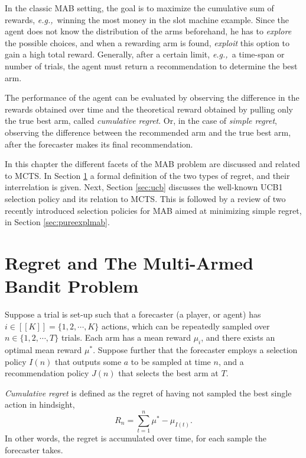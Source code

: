 \documentclass{kecsmstr}
\newcommand{\eg}{{\it e.g.,}~}
\begin{document}
In the classic MAB setting, the goal is to maximize the cumulative sum of rewards, \eg winning the most money in the slot machine example. Since the agent does not know the distribution of the arms beforehand, he has to \emph{explore} the possible choices, and when a rewarding arm is found, \emph{exploit} this option to gain a high total reward. Generally, after a certain limit, \eg a time-span or number of trials, the agent must return a recommendation to determine the best arm.

The performance of the agent can be evaluated by observing the difference in the rewards obtained over time and the theoretical reward obtained by pulling only the true best arm, called \emph{cumulative regret}. Or, in the case of \emph{simple regret}, observing the difference between the recommended arm and the true best arm, after the forecaster makes its final recommendation.
\vspace{2 mm}

In this chapter the different facets of the MAB problem are discussed and related to MCTS. In Section \ref{sec:mabprob} a formal definition of the two types of regret, and their interrelation is given. Next, Section \ref{sec:ucb} discusses the well-known UCB1 selection policy and its relation to MCTS. This is followed by a review of two recently introduced selection policies for MAB aimed at minimizing simple regret, in Section \ref{sec:pureexplmab}.

\newpage

\section{Regret and The Multi-Armed Bandit Problem}
\label{sec:mabprob}
Suppose a trial is set-up such that a forecaster (a player, or agent) has $i \in [[K]] = \{1, 2, \cdots, K \}$ actions, which can be repeatedly sampled over $n \in \{ 1, 2, \cdots, T \}$ trials. Each arm has a mean reward $\mu_i$, and there exists an optimal mean reward $\mu^*$. Suppose further that the forecaster employs a selection policy $I(n)$ that outputs some $a$ to be sampled at time $n$, and a recommendation policy $J(n)$ that selects the best arm at $T$.

\emph{Cumulative regret} is defined as the regret of having not sampled the best single action in hindsight, 
\begin{equation}
R_n = \sum_{t = 1}^{n}{\mu^* - \mu_{I(t)}}.
\end{equation}
In other words, the regret is accumulated over time, for each sample the forecaster takes.
\end{document}
